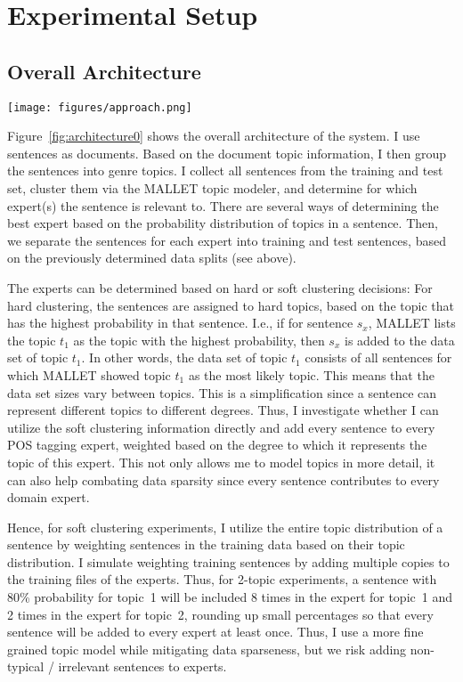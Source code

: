 \section{Experimental Setup}\label{sec:setup}

\subsection{Overall Architecture}

\begin{figure*}[!t]
    \centering
    \texttt{[image: figures/approach.png]}
 \caption{Overview of the architecture of the POS tagging and parsing experts.}\label{fig:architecture0}   
 \end{figure*}

Figure~\ref{fig:architecture0} shows the overall architecture of the system. 
I use sentences as documents. Based on the document topic information, I then group the sentences into genre topics. I collect all sentences from the training and test set, cluster them via the MALLET topic modeler, and determine for which expert(s) the sentence is relevant to. There are several ways of determining the best expert based on the probability distribution of topics in a sentence. Then, we separate the sentences for each expert into training and test sentences, based on the previously determined data splits (see above).

The experts can be determined based on hard or soft clustering decisions: For hard clustering, the sentences are assigned to hard topics, based on the topic that has the highest probability in that sentence. I.e., if for sentence $s_x$, MALLET lists the topic $t_1$ as the topic with the highest probability, then $s_x$ is added to the data set of topic $t_1$. In other words, the data set of topic $t_1$ consists of all sentences for which MALLET showed topic $t_1$ as the most likely topic. This means that the data set sizes vary between topics. This is a simplification since a sentence can represent different topics to different degrees. Thus, I investigate whether I can utilize the soft clustering information directly and add every sentence to every POS tagging expert, weighted based on the degree to which it represents the topic of this expert. This not only allows me to model topics in more detail, it can also help combating data sparsity since every sentence contributes to every domain expert.

Hence, for soft clustering experiments, I utilize the entire topic distribution of a sentence by weighting sentences in the training data based on their topic distribution. I simulate weighting training sentences by adding multiple copies to the training files of the experts. Thus, for 2-topic experiments, a sentence with 80\% probability for topic~1 will be included 8 times in the expert for topic~1 and 2 times in the expert for topic~2, rounding up small percentages so that every sentence will be added to every expert at least once.  Thus, I use a more fine grained topic model while mitigating data sparseness,  but we risk adding non-typical / irrelevant sentences to experts.

